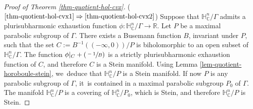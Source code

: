 \documentclass[JEP,XML,SOM,Unicode,NoEqCountersInSection,published]{cedram}
\newcommand{\Psfrac}[2]{(\sfrac{#1}{#2})}
\theoremstyle{definition}
\newcommand{\C}{\mathbb{C}}
\newcommand{\R}{\mathbb{R}}
\newcommand{\HNC}{\mathbb{H}^{n}_{\C}}
\def\C{\mathbb{C}}
\newcommand{\HNC}{\mathbb{H}^{n}_{\C}}
\begin{document}
\skpt
\begin{proof}[Proof of Theorem \ref{thm-quotient-hol-cvx}]
($\eqref{thm-quotient-hol-cvx1}\Rightarrow\eqref{thm-quotient-hol-cvx2}$) Suppose that $\HNC/\Gamma$ admits a plurisubharmonic exhaustion function $\phi:\HNC/\Gamma\to \R$. Let $P$ be a maximal parabolic subgroup of $\Gamma$. There exists a Busemann function $B$, invariant under $P$, such that the set $C:=B^{-1}((-\infty,0))/P$ is biholomorphic to an open subset of $\HNC/\Gamma$. The function $\phi\vert_{ C} + \Psfrac{-1}{B}$ is a strictly plurisubharmonic exhaustion function of $C$, and therefore $C$ is a Stein manifold. Using Lemma \ref{lem-quotient-horoboule-stein}, we~deduce that $\HNC/P$ is a Stein manifold. If now $P$ is any parabolic subgroup of $\Gamma$, it~is contained in a maximal parabolic subgroup $P_0$ of $\Gamma$. The manifold $\HNC/P$ is a covering of $\HNC/P_0$, which is Stein, and therefore $\HNC/P$ is Stein.


\end{proof}
\end{document}
